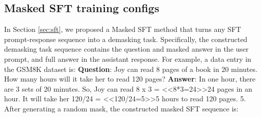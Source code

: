 \begin{table}[htbp]
\centering
\caption{To compare the rate of convergence, we fit the accuracy curve as a function of training steps to $A(1-e^{-kx})$. ``$A$'' is the accuracy at convergence; $k$ is the rate of convergence (unit $1/step$).}
\label{tab:convergence}
\scriptsize
\setlength{\tabcolsep}{4pt}
\renewcommand{\arraystretch}{1.15}

\end{table}

\subsection{Masked SFT training configs}

In Section \ref{sec:sft}, we proposed a Masked SFT method that turns any SFT prompt-response sequence into a demasking task. Specifically, the constructed demasking task sequence contains the question and masked answer in the user prompt, and full answer in the assistant response. For example, a data entry in the GSM8K dataset is: \textbf{Question}:
Joy can read 8 pages of a book in 20 minutes. How many hours will it take her to read 120 pages? \textbf{Answer}: In one hour, there are 3 sets of 20 minutes. So, Joy can read 8 x 3 = <<8*3=24>>24 pages in an hour. It will take her 120/24 = <<120/24=5>>5 hours to read 120 pages. 5. After generating a random mask, the constructed masked SFT sequence is: 

